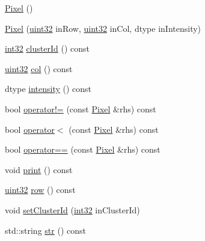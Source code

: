 \begin{DoxyCompactItemize}
\item 
\mbox{\hyperlink{class_num_cpp_1_1_image_processing_1_1_pixel_a320431ffebb87965df4a4f6aa749daf1}{Pixel}} ()
\item 
\mbox{\hyperlink{class_num_cpp_1_1_image_processing_1_1_pixel_a8124fcf8a485b3ee916ebcf28ab53c69}{Pixel}} (\mbox{\hyperlink{namespace_num_cpp_a36f388e948380413c63011cab9b7fbd5}{uint32}} in\+Row, \mbox{\hyperlink{namespace_num_cpp_a36f388e948380413c63011cab9b7fbd5}{uint32}} in\+Col, dtype in\+Intensity)
\item 
\mbox{\hyperlink{namespace_num_cpp_acf3eb1592f8b248ff0a236634864633c}{int32}} \mbox{\hyperlink{class_num_cpp_1_1_image_processing_1_1_pixel_af4d80ac55e105ec61e44661614069154}{cluster\+Id}} () const
\item 
\mbox{\hyperlink{namespace_num_cpp_a36f388e948380413c63011cab9b7fbd5}{uint32}} \mbox{\hyperlink{class_num_cpp_1_1_image_processing_1_1_pixel_a7fca43616140f9578d4cadc6983f91cf}{col}} () const
\item 
dtype \mbox{\hyperlink{class_num_cpp_1_1_image_processing_1_1_pixel_ab5c4e0bd7121e3a51ccf3ae5e7a9f621}{intensity}} () const
\item 
bool \mbox{\hyperlink{class_num_cpp_1_1_image_processing_1_1_pixel_a9d963978a04c7289bd2594981ee7b0f4}{operator!=}} (const \mbox{\hyperlink{class_num_cpp_1_1_image_processing_1_1_pixel}{Pixel}} \&rhs) const
\item 
bool \mbox{\hyperlink{class_num_cpp_1_1_image_processing_1_1_pixel_a4ffbcd1bcb81809d257e98156ed9597e}{operator$<$}} (const \mbox{\hyperlink{class_num_cpp_1_1_image_processing_1_1_pixel}{Pixel}} \&rhs) const
\item 
bool \mbox{\hyperlink{class_num_cpp_1_1_image_processing_1_1_pixel_a4b329520b239e27c9db284154356e818}{operator==}} (const \mbox{\hyperlink{class_num_cpp_1_1_image_processing_1_1_pixel}{Pixel}} \&rhs) const
\item 
void \mbox{\hyperlink{class_num_cpp_1_1_image_processing_1_1_pixel_a69ef2bd3697c1acd747ec6fb5bc646e1}{print}} () const
\item 
\mbox{\hyperlink{namespace_num_cpp_a36f388e948380413c63011cab9b7fbd5}{uint32}} \mbox{\hyperlink{class_num_cpp_1_1_image_processing_1_1_pixel_af5240a6addc57c5951fb38879b18162d}{row}} () const
\item 
void \mbox{\hyperlink{class_num_cpp_1_1_image_processing_1_1_pixel_acd32a7a205a4cc81124036a7c28a498a}{set\+Cluster\+Id}} (\mbox{\hyperlink{namespace_num_cpp_acf3eb1592f8b248ff0a236634864633c}{int32}} in\+Cluster\+Id)
\item 
std\+::string \mbox{\hyperlink{class_num_cpp_1_1_image_processing_1_1_pixel_a0a5f411bdc0968593aafb9bad247382b}{str}} () const
\end{DoxyCompactItemize}
